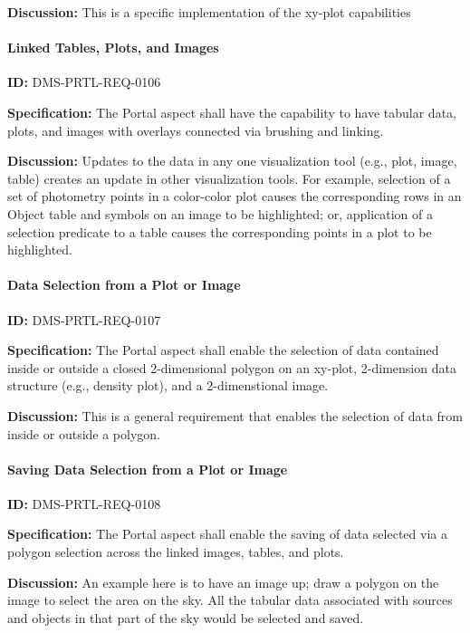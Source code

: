 \documentclass[SE,toc]{lsstdoc}
\begin{document}
\textbf{Discussion:}
This is a specific implementation of the xy-plot capabilities

\paragraph{Linked Tables, Plots, and Images}\hfill  %

\label{DMS-PRTL-REQ-0106}
\textbf{ID:} DMS-PRTL-REQ-0106

\textbf{Specification:}
The Portal aspect shall have the capability to have tabular data, plots, and images with overlays connected via brushing and linking.

\textbf{Discussion:}
Updates to the data in any one visualization tool (e.g., plot, image, table) creates an update in other visualization tools.  For example, selection of a set of photometry points in a color-color plot causes the corresponding rows in an Object table and symbols on an image to be highlighted; or, application of a selection predicate to a table causes the corresponding points in a plot to be highlighted.

\paragraph{Data Selection from a Plot or Image}\hfill  %

\label{DMS-PRTL-REQ-0107}
\textbf{ID:} DMS-PRTL-REQ-0107

\textbf{Specification:}
The Portal aspect shall enable the selection of data contained inside or outside a closed 2-dimensional polygon on an xy-plot, 2-dimension data structure (e.g., density plot), and a 2-dimenstional image.

\textbf{Discussion:}
This is a general requirement that enables the selection of data from inside or outside a polygon.

\paragraph{Saving Data Selection from a Plot or Image}\hfill  %

\label{DMS-PRTL-REQ-0108}
\textbf{ID:} DMS-PRTL-REQ-0108

\textbf{Specification:}
The Portal aspect shall enable the saving of data selected via a polygon selection across the linked images, tables, and plots.

\textbf{Discussion:}
An example here is to have an image up; draw a polygon on the image to select the area on the sky.  All the tabular data associated with sources and objects in that part of the sky would be selected and saved.
\end{document}
